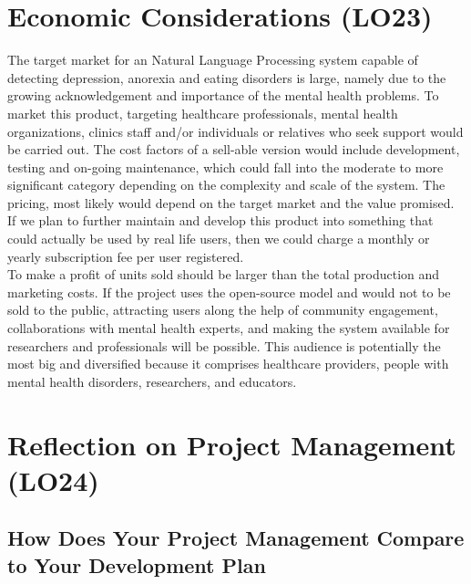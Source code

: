 \documentclass{article}
\begin{document}

\section{Economic Considerations (LO23)}

The target market  for an Natural Language Processing system capable of detecting depression, anorexia and eating disorders is large, namely due to the growing acknowledgement and importance of the mental health problems. To market this product, targeting healthcare professionals, mental health organizations, clinics staff and/or individuals or relatives who seek support would be carried out. The cost factors of a sell-able version would include development, testing and on-going maintenance, which could fall into the moderate to more significant category depending on the complexity and scale of the system. The pricing, most likely would depend on the target market and the value promised.  If we plan to further maintain and develop this product into something that could actually be used by real life users, then we could charge a monthly or yearly subscription fee per user registered. \\ To make a profit of units sold should be larger than the total production and marketing costs. If the project uses the open-source model and would not to be sold to the public, attracting users along the help of community engagement, collaborations with mental health experts, and making the system available for researchers and professionals will be possible. This audience is potentially the most big and diversified because it comprises healthcare providers, people with mental health disorders, researchers, and educators.

\section{Reflection on Project Management (LO24)}


\subsection{How Does Your Project Management Compare to Your Development Plan}

\end{document}
